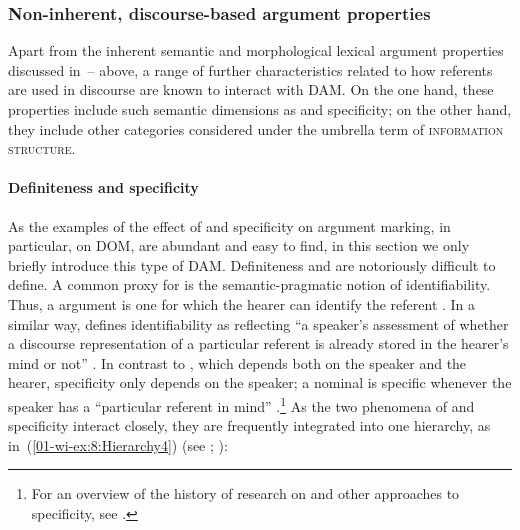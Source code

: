 \documentclass[output=paper]{LSP/langsci}
\begin{document}
\subsubsection{Non-inherent, discourse-based argument properties}
\label{01-wi-sec:2.1.3-Non-inherent-discourse}

Apart from the inherent semantic and morphological lexical argument properties discussed in~– above, a range of further characteristics related to how referents are used in discourse are known to interact with DAM. 
On the one hand, these properties include such semantic dimensions as  and specificity; %
 on the other hand, they include other categories considered under the umbrella term of \textsc{information structure}. %

\paragraph*{Definiteness and specificity}
\label{01-wi-sec:2.1.3.1-Definiteness}

As the examples of the effect of  and specificity on argument marking, in particular, on DOM, are abundant and easy to find, in this section we only briefly introduce this type of DAM. 
Definiteness and  are notoriously difficult to define. 
A common proxy for  is the semantic-pragmatic notion of identifiability. 
Thus, a  argument is one for which the hearer can identify the referent \citep[2--5]{Lyons1999Definiteness}. 
In a similar way, \citet{Lambrecht1994Information} defines identifiability as reflecting “a speaker’s assessment of whether a discourse representation of a particular referent is already stored in the hearer’s mind or not” \citep[76]{Lambrecht1994Information}.
 In contrast to , which depends both on the speaker and the hearer, specificity only depends on the speaker; a nominal is specific whenever the speaker has a “particular referent in mind” \citep[35]{Lyons1999Definiteness}.\footnote{For an overview of the history of research on  and other approaches to specificity, see \citet{vonHeusinger2011Specificity}.} 
As the two phenomena of  and specificity interact closely, they are frequently integrated into one hierarchy, as in~(\ref{01-wi-ex:8:Hierarchy4}) (see \eg \citealt[94]{Comrie1986Markedness}; \citealt[132]{Croft2003Typology}):
\end{document}
